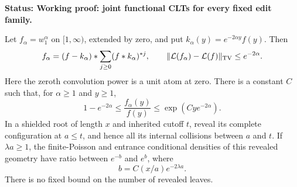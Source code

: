\documentclass[11pt,letterpaper]{article}
\newcommand{\status}[1]{\textbf{Status: #1.}}
\begin{document}
\status{Working proof: joint functional CLTs for every fixed edit family}

\begin{lemma}
\label{lem:relative-gap-density}
Let $f_\alpha=w_1^\alpha$ on $[1,\infty)$, extended by zero,
and put $k_\alpha(y)=e^{-2\alpha y}f(y)$. Then
\begin{equation}\label{eq:positive-gap-comparison}
 f_\alpha=(f-k_\alpha)*
          \sum_{j\ge0}(f*k_\alpha)^{*j},
 \qquad \|\mathcal L(f_\alpha)-\mathcal L(f)\|_{\rm TV}
                  \le e^{-2\alpha}.
\end{equation}
Here the zeroth convolution power is a unit atom at zero.
There is a constant $C$ such that, for $\alpha\ge1$ and $y\ge1$,
\begin{equation}\label{eq:relative-gap-density}
 1-e^{-2\alpha}\le\frac{f_\alpha(y)}{f(y)}
                \le\exp(Cy e^{-2\alpha}).
\end{equation}
In a shielded root of length $x$ and inherited cutoff $t$, reveal
its complete configuration at $a\le t$, and hence all its internal
collisions between $a$ and $t$. If $\lambda a\ge1$, the finite-Poisson
and entrance conditional densities of this revealed geometry have
ratio between $e^{-b}$ and $e^b$, where
\begin{equation}\label{eq:full-skeleton-ratio}
 b=C(x/a)e^{-2\lambda a}.
\end{equation}
There is no fixed bound on the number of revealed leaves.
\end{lemma}
\end{document}
